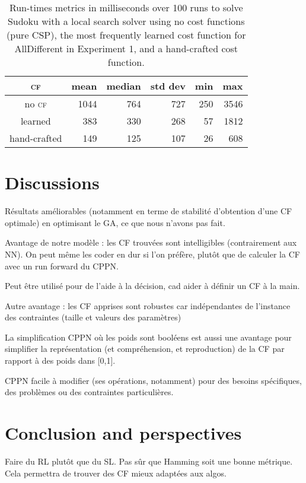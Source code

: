 \documentclass{article}
\newcommand{\csp}{\textsc{CSP}\xspace}
\newcommand{\cf}{\textsc{cf}\xspace}
\begin{document}
\begin{table}
  \centering
\begin{tabular}{|c|r|r|r|r|r|}
  \hline
  \cf & mean & median & std dev & min & max\\
  \hline
  no \cf & 1044 & 764 & 727 & 250 & 3546\\
  learned & 383 & 330 & 268 & 57 & 1812\\
  hand-crafted & 149 & 125 & 107 & 26 & 608\\
  \hline
\end{tabular}
\caption{Run-times metrics in milliseconds over 100 runs to solve Sudoku with a local search solver using no cost functions (pure \csp), the most frequently learned cost function for AllDifferent in Experiment 1, and a hand-crafted cost function.}
\label{tab:sudoku}
\end{table}



\section{Discussions}

Résultats améliorables  (notamment en  terme de  stabilité d'obtention
d'une CF optimale) en optimisant le GA, ce que nous n'avons pas fait.

Avantage  de  notre  modèle  :  les  CF  trouvées  sont  intelligibles
(contrairement aux NN). On peut même les coder en dur si l'on préfère,
plutôt que de calculer la CF avec un run forward du CPPN.

Peut être utilisé pour de l'aide à la décision, cad aider à définir un
CF à la main.

Autre avantage  : les CF  apprises sont robustes car  indépendantes de
l'instance des contraintes (taille et valeurs des paramètres)

La  simplification CPPN  où  les  poids sont  booléens  est aussi  une
avantage  pour  simplifier  la représentation  (et  compréhension,  et
reproduction) de la CF par rapport à des poids dans [0,1].

CPPN facile  à modifier (ses  opérations, notamment) pour  des besoins
spécifiques, des problèmes ou des contraintes particulières.


\section{Conclusion and perspectives}\label{sec:conclusion}

Faire du  RL plutôt  que du  SL. Pas  sûr que  Hamming soit  une bonne
métrique. Cela permettra de trouver des CF mieux adaptées aux algos.




\end{document}
